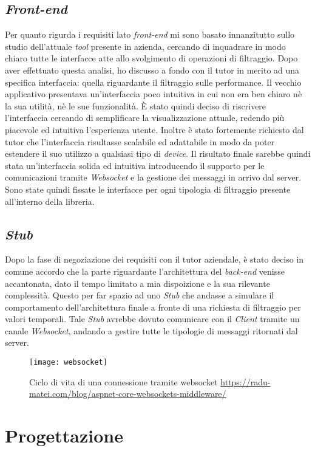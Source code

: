 \subsection{\textit{Front-end}}
Per quanto rigurda i requisiti lato \textit{front-end} mi sono basato innanzitutto sullo studio dell'attuale \textit{tool} presente in azienda, cercando di inquadrare in modo chiaro tutte le interfacce atte allo svolgimento di operazioni di filtraggio. Dopo aver effettuato questa analisi, ho discusso a fondo con il tutor in merito ad una specifica interfaccia: quella riguardante il filtraggio sulle performance. Il vecchio applicativo presentava un'interfaccia poco intuitiva in cui non era ben chiaro nè la sua utilità, nè le sue funzionalità. È stato quindi deciso di riscrivere l'interfaccia cercando di semplificare la visualizzazione attuale, redendo più piacevole ed intuitiva l'esperienza utente. Inoltre è stato fortemente richiesto dal tutor che l'interfaccia risultasse scalabile ed adattabile in modo da poter estendere il suo utilizzo a qualsiasi tipo di \textit{device}. Il risultato finale sarebbe quindi stata un'interfaccia solida ed intuitiva introducendo il supporto per le comunicazioni tramite \textit{\gls{Websocket}} e la gestione dei messaggi in arrivo dal server. Sono state quindi fissate le interfacce per ogni tipologia di filtraggio presente all'interno della libreria.

\subsection{\textit{Stub}}
Dopo la fase di negoziazione dei requisiti con il tutor aziendale, è stato deciso in comune accordo che la parte riguardante l'architettura del \textit{back-end} venisse accantonata, dato il tempo limitato a mia dispoizione e la sua rilevante complessità. Questo per far spazio ad uno \textit{Stub} che andasse a simulare il comportamento dell'architettura finale a fronte di una richiesta di filtraggio per valori temporali. Tale \textit{Stub} avrebbe dovuto comunicare con il \textit{Client} tramite un canale \textit{Websocket}, andando a gestire tutte le tipologie di messaggi ritornati dal server.
\begin{figure}[!h] 
	\centering 
	\texttt{[image: websocket]} 
	\caption{Ciclo di vita di una connessione tramite websocket \url{https://radu-matei.com/blog/aspnet-core-websockets-middleware/}}
\end{figure}
\newpage
\section{Progettazione}
